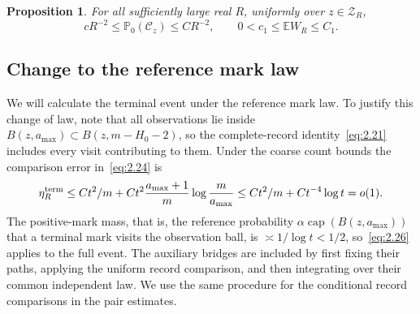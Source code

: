 \documentclass[11pt,letterpaper,reqno]{amsart}
\newif\ifrevmarks \revmarkstrue
\newcommand{\add}[1]{\ifrevmarks\textcolor{revorange}{#1}\else#1\fi}
\numberwithin{equation}{section}
\newtheorem{proposition}[theorem]{Proposition}
\theoremstyle{remark}
\begin{document}
\begin{proposition}\label{prop:onepoint}
For all sufficiently large real $R$, uniformly over $z\in\mathscr Z_R$,
\begin{equation}\label{eq:7.28}
cR^{-2}\le\mathbb P_0(\mathcal C_z)\le CR^{-2},\qquad
0<c_1\le\mathbb EW_R\le C_1.
\end{equation}
\end{proposition}

\subsection{\texorpdfstring{\add{Change to the reference mark law}}{Change to the reference mark law}}\label{sec:lowercomparison}
We will calculate the terminal event under the reference mark law. To justify this change of law, note that all observations lie inside $B(z,a_{\max})\subset B(z,m-H_0-2)$, so the complete-record identity~\eqref{eq:2.21} includes every visit contributing to them.
Under the coarse count bounds the comparison error in~\eqref{eq:2.24} is
\begin{equation}\label{eq:5.17}
\eta_R^{\rm term}\le Ct^2/m+
Ct^2\frac{a_{\max}+1}{m}\log\frac m{a_{\max}}
\le Ct^2/m+Ct^{-4}\log t=o(1).
\end{equation}
The positive-mark mass\add{, that is, the reference probability $\alpha\operatorname{cap}(B(z,a_{\max}))$ that a terminal mark visits the observation ball,} is $\asymp1/\log t<1/2$, so~\eqref{eq:2.26}
applies to the full event. The auxiliary bridges are included by first fixing their paths, applying the uniform record comparison, and then integrating over their common independent law. We use the same procedure for the conditional record comparisons in the pair estimates.
\end{document}
